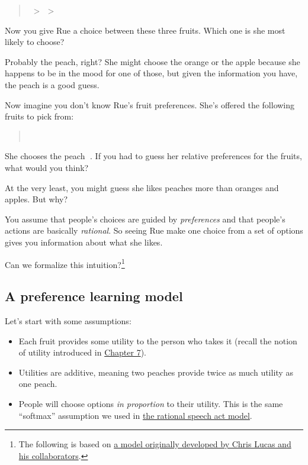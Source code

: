 \documentclass[
  letterpaper,
  DIV=11,
  numbers=noendperiod]{scrreprt}
\providecommand{\tightlist}{%
  \setlength{\itemsep}{0pt}\setlength{\parskip}{0pt}}
\begin{document}
\begin{quote}
🍑 \textgreater{} 🍊 \textgreater{} 🍎
\end{quote}

Now you give Rue a choice between these three fruits. Which one is she
most likely to choose?

Probably the peach, right? She might choose the orange or the apple
because she happens to be in the mood for one of those, but given the
information you have, the peach is a good guess.

Now imagine you don't know Rue's fruit preferences. She's offered the
following fruits to pick from:

\begin{quote}
🍑 🍊 🍎
\end{quote}

She chooses the peach 🍑. If you had to guess her relative preferences
for the fruits, what would you think?

At the very least, you might guess she likes peaches more than oranges
and apples. But why?

You assume that people's choices are guided by \emph{preferences} and
that people's actions are basically \emph{rational}. So seeing Rue make
one choice from a set of options gives you information about what she
likes.

Can we formalize this intuition?\footnote{The following is based on
  \href{https://journals.plos.org/plosone/article?id=10.1371/journal.pone.0092160}{a
  model originally developed by Chris Lucas and his collaborators}.}

\subsection{A preference learning
model}\label{a-preference-learning-model}

Let's start with some assumptions:

\begin{itemize}
\tightlist
\item
  Each fruit provides some utility to the person who takes it (recall
  the notion of utility introduced in \hyperref[pragmatics]{Chapter 7}).
\item
  Utilities are additive, meaning two peaches provide twice as much
  utility as one peach.
\item
  People will choose options \emph{in proportion} to their utility. This
  is the same ``softmax'' assumption we used in \hyperref[rsa-model]{the
  rational speech act model}.
\end{itemize}
\end{document}
